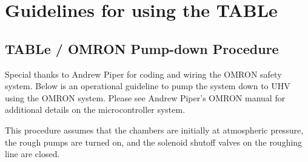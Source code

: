 \chapter{Guidelines for using the TABLe}
\label{appendix:TABLe_manual}

\section{TABLe / OMRON Pump-down Procedure}
\label{sec:OMRON_instructions}

Special thanks to Andrew Piper for coding and wiring the OMRON safety system. Below is an operational guideline to pump the system down to UHV using the OMRON system. Please see Andrew Piper's OMRON manual for additional details on the microcontroller system.

This procedure assumes that the chambers are initially at atmospheric pressure, the rough pumps are turned on, and the solenoid shutoff valves on the roughing line are closed.

